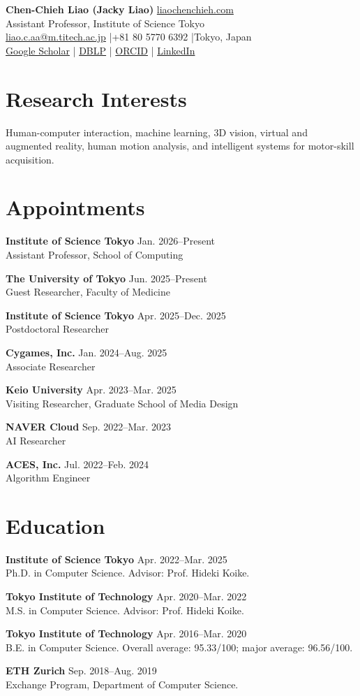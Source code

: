 \documentclass[10pt,a4paper]{article}
\newcommand{\cvitem}[3]{\textbf{#1} \hfill {\small #2}\\#3\par}
\begin{document}
{\Huge\sffamily\bfseries Chen-Chieh Liao (Jacky Liao)}\hfill
\href{https://liaochenchieh.com}{liaochenchieh.com}\\[-1pt]
{\large\sffamily Assistant Professor, Institute of Science Tokyo}\\
\href{mailto:liao.c.aa@m.titech.ac.jp}{liao.c.aa@m.titech.ac.jp} \enspace|\enspace +81 80 5770 6392 \enspace|\enspace Tokyo, Japan\\[-2pt]
\href{https://scholar.google.com/citations?user=jYJJazcAAAAJ}{Google Scholar} \enspace|\enspace
\href{https://dblp.org/pid/16/8405.html}{DBLP} \enspace|\enspace
\href{https://orcid.org/0000-0002-9850-2468}{ORCID} \enspace|\enspace
\href{https://www.linkedin.com/in/chen-chieh-liao}{LinkedIn}

\section*{Research Interests}
Human-computer interaction, machine learning, 3D vision, virtual and augmented reality, human motion analysis, and intelligent systems for motor-skill acquisition.

\section*{Appointments}
\cvitem{Institute of Science Tokyo}{Jan. 2026--Present}{Assistant Professor, School of Computing}
\cvitem{The University of Tokyo}{Jun. 2025--Present}{Guest Researcher, Faculty of Medicine}
\cvitem{Institute of Science Tokyo}{Apr. 2025--Dec. 2025}{Postdoctoral Researcher}
\cvitem{Cygames, Inc.}{Jan. 2024--Aug. 2025}{Associate Researcher}
\cvitem{Keio University}{Apr. 2023--Mar. 2025}{Visiting Researcher, Graduate School of Media Design}
\cvitem{NAVER Cloud}{Sep. 2022--Mar. 2023}{AI Researcher}
\cvitem{ACES, Inc.}{Jul. 2022--Feb. 2024}{Algorithm Engineer}

\section*{Education}
\cvitem{Institute of Science Tokyo}{Apr. 2022--Mar. 2025}{Ph.D. in Computer Science. Advisor: Prof. Hideki Koike.}
\cvitem{Tokyo Institute of Technology}{Apr. 2020--Mar. 2022}{M.S. in Computer Science. Advisor: Prof. Hideki Koike.}
\cvitem{Tokyo Institute of Technology}{Apr. 2016--Mar. 2020}{B.E. in Computer Science. Overall average: 95.33/100; major average: 96.56/100.}
\cvitem{ETH Zurich}{Sep. 2018--Aug. 2019}{Exchange Program, Department of Computer Science.}
\end{document}
